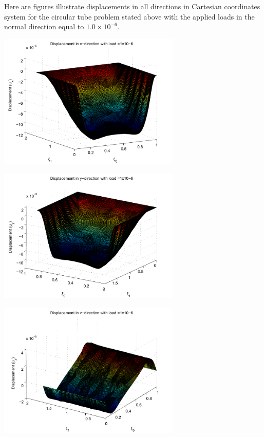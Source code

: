 Here are figures illustrate displacements in all directions in Cartesian coordinates system for the circular tube problem stated above with the applied loads in the normal direction equal to $ 1.0\times 10^{-6} $.

 
\begin{DoxyImage}
\includegraphics[width=0.65\textwidth]{Tube_x_direction}
\end{DoxyImage}


 
\begin{DoxyImage}
\includegraphics[width=0.65\textwidth]{Tube_y_direction}
\end{DoxyImage}


 
\begin{DoxyImage}
\includegraphics[width=0.65\textwidth]{Tube_z_direction}
\end{DoxyImage}


